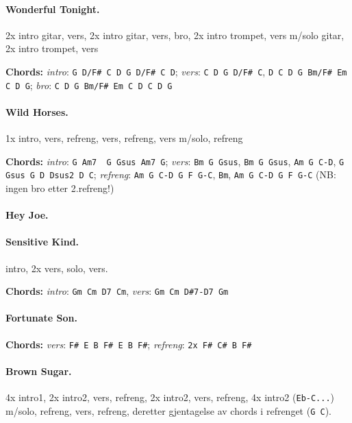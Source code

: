 \documentclass[%
twoside,                 %
final,                   %
10pt]{article}
\begin{document}
\paragraph{Wonderful Tonight.}
2x intro gitar, vers, 2x intro gitar, vers, bro, 2x intro trompet, vers m/solo gitar, 2x intro trompet, vers

\textbf{Chords:} \emph{intro}: \Verb!G D/F# C D G D/F# C D!;
\emph{vers}:
\Verb!C D G D/F# C!, \Verb!D C D G Bm/F# Em C D G!;
\emph{bro}: \Verb!C D G Bm/F# Em C D C D G!




\paragraph{Wild Horses.}
1x intro, vers, refreng, vers, refreng, vers m/solo, refreng

\textbf{Chords:} \emph{intro}: \Verb!G Am7  G Gsus Am7 G!;
\emph{vers}: \Verb!Bm G Gsus!, \Verb!Bm G Gsus!, \Verb!Am G C-D!, \Verb!G Gsus G D Dsus2 D C!;
\emph{refreng}: \Verb!Am G C-D G F G-C!, \Verb!Bm!, \Verb!Am G C-D G F G-C!
(NB: ingen bro etter 2.refreng!)





\paragraph{Hey Joe.}
\paragraph{Sensitive Kind.}
intro, 2x vers, solo, vers.

\textbf{Chords:} \emph{intro}: \Verb!Gm Cm D7 Cm!, \emph{vers}: \Verb!Gm Cm D#7-D7 Gm!





\paragraph{Fortunate Son.}


\textbf{Chords:} \emph{vers}: \Verb!F# E B F# E B F#!; \emph{refreng}: \Verb!2x F# C# B F#!





\paragraph{Brown Sugar.}
4x intro1, 2x intro2, vers, refreng, 2x intro2, vers, refreng, 4x intro2 (\Verb!Eb-C...!) m/solo, refreng, vers, refreng, deretter gjentagelse av chords i refrenget (\Verb!G C!).
\end{document}
